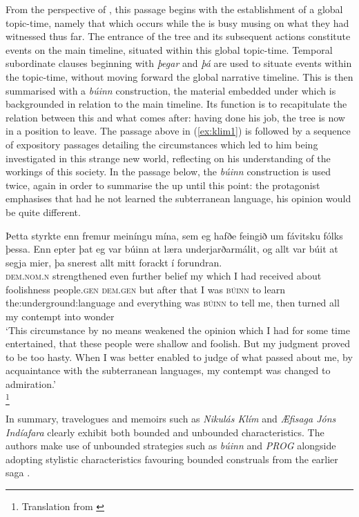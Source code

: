\documentclass[output=paper,colorlinks,citecolor=brown]{langscibook}
\begin{document}
\largerpage
From the perspective of , this passage begins with the establishment of a global topic-time, namely that which occurs while the  is busy musing on what they had witnessed thus far. The entrance of the tree and its subsequent actions constitute events on the main timeline, situated within this global topic-time. Temporal subordinate clauses beginning with \textit{þegar} and \textit{þá} are used to situate events within the topic-time, without moving forward the global narrative timeline. This  is then summarised with a \textit{búinn} construction, the material embedded under which is backgrounded in relation to the main timeline. Its function is to recapitulate the relation between this  and what comes after: having done his job, the tree is now in a position to leave. The passage above in (\ref{ex:klim1}) is followed by a sequence of expository passages detailing the circumstances which led to him being investigated in this strange new world, reflecting on his understanding of the workings of this society. In the passage below, the \textit{búinn} construction is used twice, again in order to summarise the  up until this point: the protagonist emphasises that had he not learned the subterranean language, his opinion would be quite different.

\ea
\gll Þetta styrkte enn fremur meiníngu mína, sem eg hafðe feingið um
fávitsku fólks þessa. Enn epter þat eg var búinn at læra
underjarðarmálit, og allt var búit at segja mier, þa snerest
allt mitt forackt í forundran.\\
\textsc{dem}.\textsc{nom.n} strengthened even further belief my which I had received about foolishness people.\textsc{gen} \textsc{dem}.\textsc{gen} but after that I was \textsc{búinn} to learn the:underground:language and everything was \textsc{búinn} to tell me, then turned all my contempt into wonder\\
\glt  `This circumstance by no means weakened the opinion which I had for some time entertained, that these people were shallow and foolish. But my judgment proved to be too hasty. When I was better enabled to judge of what passed about me, by acquaintance with the subterranean languages, my contempt was changed to admiration.' \\
\hfill \citep[30]{holberg1948nikulas}\footnote{Translation from \citet{holberg1845niels}}
\z

In summary, travelogues and memoirs such as \textit{Nikulás Klím} and \textit{Æfisaga Jóns Indíafara} clearly exhibit both bounded and unbounded characteristics. The authors make use of unbounded strategies such as \textit{búinn} and \textit{PROG} alongside adopting stylistic characteristics favouring bounded construals from the earlier saga .
\end{document}
